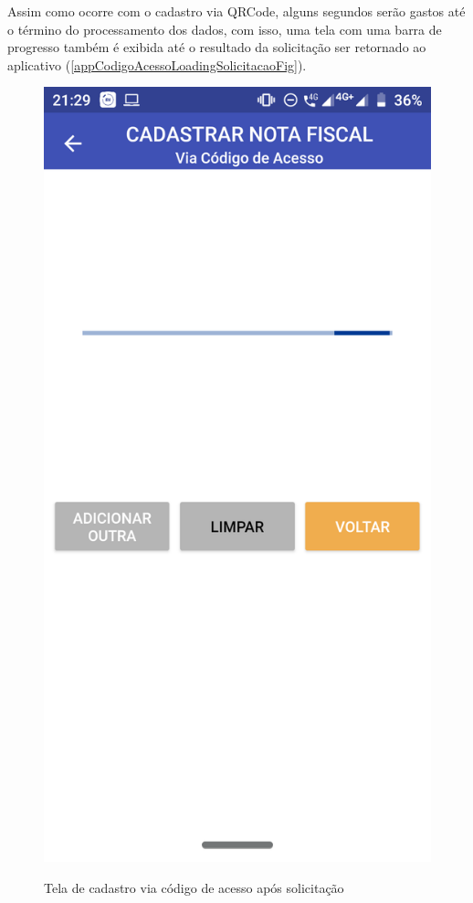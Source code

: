Assim como ocorre com o cadastro via QRCode, alguns segundos serão gastos até o término do processamento dos dados, com isso, uma tela com uma barra de progresso também é exibida até o resultado da solicitação ser retornado ao aplicativo  (\autoref{appCodigoAcessoLoadingSolicitacaoFig}).

\newpage
\begin{figure}[h]
    \centering
    \caption{Tela de cadastro via código de acesso após solicitação}
    \includegraphics[scale=0.15]{tcc/figures/app/app_codigo_acesso_loading_solicitacao.png}
    \label{appCodigoAcessoLoadingSolicitacaoFig}
\end{figure}

